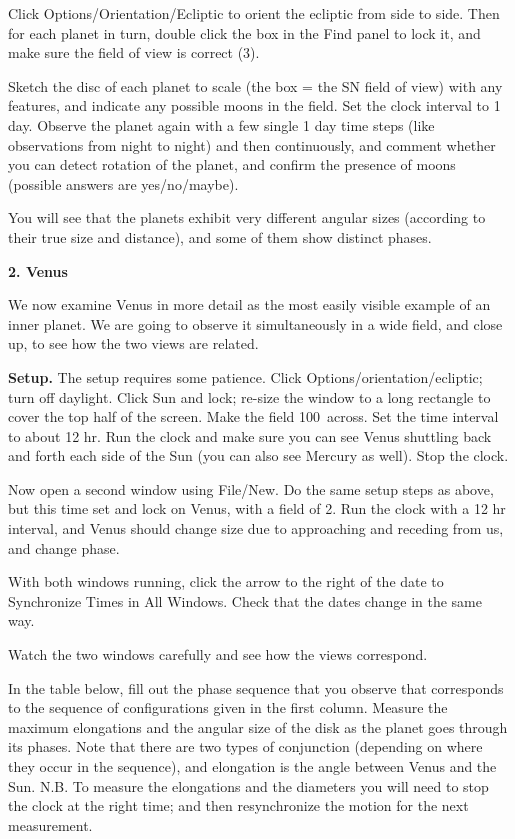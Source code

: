 Click Options/Orientation/Ecliptic to orient the ecliptic from side to
side.  Then for each planet in turn, double click the box in the Find
panel to lock it, and make sure the field of view is correct (3\arcmin).

\medskip
Sketch the disc of each planet to scale (the box = the SN field of
view) with any features, and indicate any possible moons in the
field. Set the clock interval to 1 day. Observe the planet again with
a few single 1 day time steps (like observations from night to night)
and then continuously, and comment whether you can detect rotation of
the planet, and confirm the presence of moons (possible answers are
yes/no/maybe).

You will see that the planets exhibit very different angular sizes
(according to their true size and distance), and some of them show
distinct phases.

\medskip
\bigskip
\noindent
{\bf 2. Venus}

\medskip
\noindent
We now examine Venus in more detail as the most easily visible example
of an inner planet. We are going to observe it simultaneously in a
wide field, and close up, to see how the two views are related.

\medskip\noindent
{\bf Setup.} The setup requires some patience. Click
Options/orientation/ecliptic; turn off daylight. Click Sun and lock;
re-size the window to a long rectangle to cover the top half of the screen.
Make the field 100\deg\ across. Set the time interval
to about 12 hr. Run the clock and make sure you can see Venus shuttling back
and forth each side of the Sun (you can also see Mercury as
well). Stop the clock.

\medskip
\noindent Now open a second window using File/New. Do the same setup
steps as above, but this time set and lock on Venus, with a field of
2\arcmin. Run the clock with a 12 hr interval, and Venus should change
size due to approaching and receding from us, and change phase.

\medskip
\noindent With both windows running, click the arrow to the right of
the date to Synchronize Times in All Windows.  Check that
the dates change in the same way. 

\medskip
Watch the two windows carefully and see how the views correspond.

\medskip
In the table below, fill out the phase sequence that you observe that
corresponds to the sequence of configurations given in the first
column. Measure the maximum elongations and the angular size of the
disk as the planet goes through its phases. Note that there are two
types of conjunction (depending on where they occur in the sequence),
and elongation is the angle between Venus and the Sun. N.B. To measure
the elongations and the diameters you will need to stop the clock at
the right time; and then resynchronize the motion for the next
measurement.


